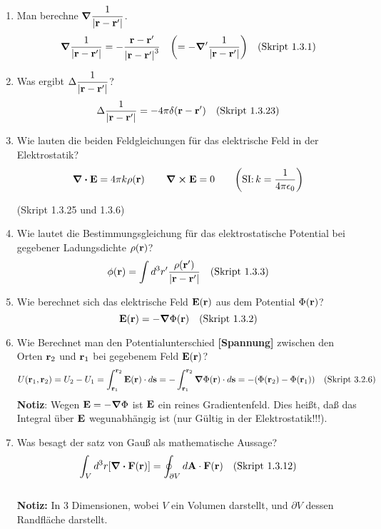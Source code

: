 \documentclass{scrartcl}
\newcommand{\rr}[1]{\frac{#1}{\abs{\vb{r}-\vb{r}'}}}
\newcommand{\ds}{\displaystyle}
\begin{document}
  \begin{enumerate}
    \item Man berechne $\ds \grad\rr{1}$.
          $$\ds \grad\rr{1}=
           -\frac{\vb r -\vb r'}{\abs{\vb r - \vb r'}^3}\quad
           \qty(=-\grad'\rr{1})\quad\text{(Skript 1.3.1)}$$ 

    \item Was ergibt $\ds \Delta\rr{1}$?
          $$\ds \Delta \rr{1} = -4\pi \delta(\vb r-\vb r')
          \quad\text{(Skript 1.3.23)}$$
      
    \item Wie lauten die beiden Feldgleichungen für das 
          elektrische Feld in der Elektrostatik?
          $$\ds \div \vb E=4\pi k\rho(\vb r)\,\qquad\curl\vb E=0
           \qquad\qty(\text{SI:}\,k=\frac{1}{4\pi\epsilon_0})$$
          \begin{center}
            (Skript 1.3.25 und 1.3.6)
          \end{center}
    
    \item Wie lautet die Bestimmungsgleichung für das elektrostatische 
          Potential bei gegebener Ladungsdichte $\rho(\vb r)$?
          $$\ds \phi(\vb r)=\int d^3r'\rr{\rho(\vb r')}
          \quad\text{(Skript 1.3.3)}$$

    \item Wie berechnet sich das elektrische Feld $\vb E (\vb r)$ aus dem
          Potential $\Phi(\vb r)$?
          $$\ds \vb E(\vb r) = - \grad \Phi (\vb r)
          \quad\text{(Skript 1.3.2)}$$

    \item Wie Berechnet man den Potentialunterschied \textbf{[Spannung]}
          zwischen den Orten 
          $\vb r_2$ und $\vb r_1$ bei gegebenem Feld $\vb E(\vb r)$?
          $$\ds U(\vb r_1, \vb r_2)=U_2-U_1
           =\int_{\vb r_1}^{\vb r_2} \vb E(\vb r)\cdot d\vb s
           =-\int_{\vb r_1}^{\vb r_2} \vb \grad \Phi (\vb r)\cdot d\vb s
           =-\qty(\Phi(\vb r_2)-\Phi(\vb r_1))
           \quad\text{(Skript 3.2.6)}$$
          \textbf{Notiz}: Wegen $\vb E=-\grad\Phi$ ist $\vb E$ ein reines
          Gradientenfeld. Dies heißt, daß das Integral über $\vb E$
          wegunabhängig ist (nur Gültig in der Elektrostatik!!!).

    \item Was besagt der satz von Gauß als mathematische Aussage?
          $$\ds \int_V d^3r \qty[\div \vb F(\vb r)]=
           \oint_{\partial V}d\vb A\cdot \vb F(\vb r)
           \quad\text{(Skript 1.3.12)}$$\\
          \textbf{Notiz:} In 3 Dimensionen, wobei $V$ ein Volumen darstellt,
          und $\partial V$ dessen Randfläche darstellt.


\end{enumerate}
\end{document}
